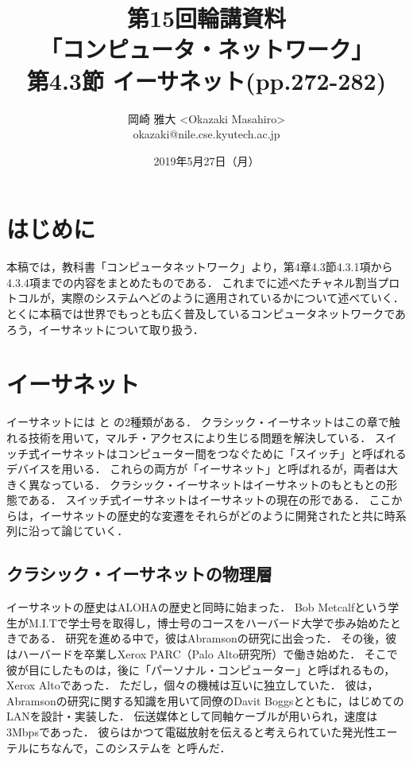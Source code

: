 \documentclass[a4paper]{ltjsarticle}
\title{第15回輪講資料\\
「コンピュータ・ネットワーク」\\
第4.3節 イーサネット(pp.272-282)}
\author{岡崎 雅大 <Okazaki Masahiro>\\
okazaki@nile.cse.kyutech.ac.jp}
\date{2019年5月27日（月）}
\begin{document}
\maketitle
\tableofcontents
\section{はじめに}\label{ux306fux3058ux3081ux306b}

本稿では，教科書「コンピュータネットワーク」より，第4章4.3節4.3.1項から4.3.4項までの内容をまとめたものである．
これまでに述べたチャネル割当プロトコルが，実際のシステムへどのように適用されているかについて述べていく．
とくに本稿では世界でもっとも広く普及しているコンピュータネットワークであろう，イーサネットについて取り扱う．

\section{イーサネット}\label{ux30a4ux30fcux30b5ux30cdux30c3ux30c8}

イーサネットには 
と  の2種類がある．
クラシック・イーサネットはこの章で触れる技術を用いて，マルチ・アクセスにより生じる問題を解決している．
スイッチ式イーサネットはコンピューター間をつなぐために「スイッチ」と呼ばれるデバイスを用いる．
これらの両方が「イーサネット」と呼ばれるが，両者は大きく異なっている．
クラシック・イーサネットはイーサネットのもともとの形態である．
スイッチ式イーサネットはイーサネットの現在の形である．
ここからは，イーサネットの歴史的な変遷をそれらがどのように開発されたと共に時系列に沿って論じていく．

\subsection{クラシック・イーサネットの物理層}\label{ux30afux30e9ux30b7ux30c3ux30afux30a4ux30fcux30b5ux30cdux30c3ux30c8ux306eux7269ux7406ux5c64}

イーサネットの歴史はALOHAの歴史と同時に始まった． Bob
Metcalfという学生がM.I.Tで学士号を取得し，博士号のコースをハーバード大学で歩み始めたときである．
研究を進める中で，彼はAbramsonの研究に出会った．
その後，彼はハーバードを卒業しXerox PARC（Palo
Alto研究所）で働き始めた．
そこで彼が目にしたものは，後に「パーソナル・コンピューター」と呼ばれるもの，Xerox
Altoであった． ただし，個々の機械は互いに独立していた．
彼は，Abramsonの研究に関する知識を用いて同僚のDavit
Boggsとともに，はじめてのLANを設計・実装した．
伝送媒体として同軸ケーブルが用いられ，速度は3Mbpsであった．
彼らはかつて電磁放射を伝えると考えられていた発光性エーテルにちなんで，このシステムを
 と呼んだ．
\end{document}
